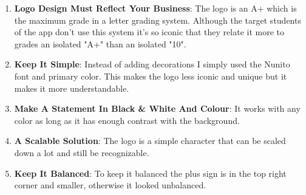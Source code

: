 \begin{enumerate}
    \item \textbf{Logo Design Must Reflect Your Business}: The logo is an A+ which is the maximum grade in a letter grading system. Although the target students of the app don't use this system it's so iconic that they relate it more to grades an isolated "A+" than an isolated "10". 
    \item \textbf{Keep It Simple}: Instead of adding decorations I simply used the Nunito font and primary color. This makes the logo less iconic and unique but it makes it more understandable.
    \item \textbf{Make A Statement In Black \& White And Colour}: It works with any color as long as it has enough contrast with the background.
    \item \textbf{A Scalable Solution}: The logo is a simple character that can be scaled down a lot and still be recognizable. 
    \item \textbf{Keep It Balanced}: To keep it balanced the plus sign is in the top right corner and smaller, otherwise it looked unbalanced.
\end{enumerate}




